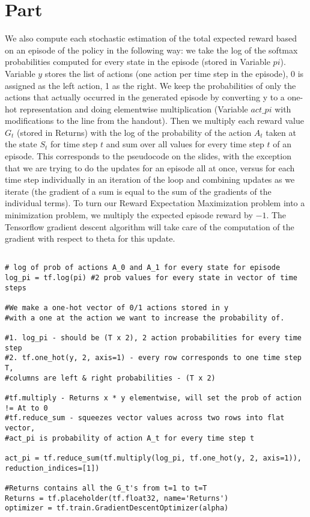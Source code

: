 \documentclass{article}
\newcommand{\enterProblemHeader}[1]{
}
\newcommand{\exitProblemHeader}[1]{
}
\newcounter{homeworkProblemCounter} %
\newcommand{\homeworkProblemName}{}
\newenvironment{homeworkProblem}[1][Part \arabic{homeworkProblemCounter}]{ %
\stepcounter{homeworkProblemCounter} %
\renewcommand{\homeworkProblemName}{#1} %
\section{\homeworkProblemName} %
\enterProblemHeader{\homeworkProblemName} %
}{
\exitProblemHeader{\homeworkProblemName} %
}
\begin{document}
\begin{homeworkProblem}
\begin{enumerate}
We also compute each stochastic estimation of the total expected reward based on an episode of the policy in the following way: we take the log of the softmax probabilities computed for every state in the episode (stored in Variable $pi$). Variable $y$ stores the list of actions (one action per time step in the episode), 0 is assigned as the left action, 1 as the right. We keep the probabilities of only the actions that actually occurred in the generated episode by converting y to a one-hot representation and doing elementwise multiplication (Variable $act\_pi$ with modifications to the line from the handout). Then we multiply each reward value $G_{t}$ (stored in Returns) with the log of the probability of the action $A_{t}$ taken at the state $S_{t}$ for time step $t$ and sum over all values for every time step $t$ of an episode. This corresponds to the pseudocode on the slides, with the exception that we are trying to do the updates for an episode all at once, versus for each time step individually in an iteration of the loop and combining updates as we iterate (the gradient of a sum is equal to the sum of the gradients of the individual terms). To turn our Reward Expectation Maximization problem into a minimization problem, we multiply the expected episode reward by $-1$. The Tensorflow gradient descent algorithm will take care of the computation of the gradient with respect to theta for this update.    \\ 

\begin{lstlisting}

# log of prob of actions A_0 and A_1 for every state for episode
log_pi = tf.log(pi) #2 prob values for every state in vector of time steps 

#We make a one-hot vector of 0/1 actions stored in y
#with a one at the action we want to increase the probability of.

#1. log_pi - should be (T x 2), 2 action probabilities for every time step
#2. tf.one_hot(y, 2, axis=1) - every row corresponds to one time step T, 
#columns are left & right probabilities - (T x 2)

#tf.multiply - Returns x * y elementwise, will set the prob of action != At to 0
#tf.reduce_sum - squeezes vector values across two rows into flat vector,
#act_pi is probability of action A_t for every time step t

act_pi = tf.reduce_sum(tf.multiply(log_pi, tf.one_hot(y, 2, axis=1)),
reduction_indices=[1])

#Returns contains all the G_t's from t=1 to t=T     
Returns = tf.placeholder(tf.float32, name='Returns')
optimizer = tf.train.GradientDescentOptimizer(alpha)


\end{lstlisting}
\end{enumerate}
\end{homeworkProblem}
\end{document}
